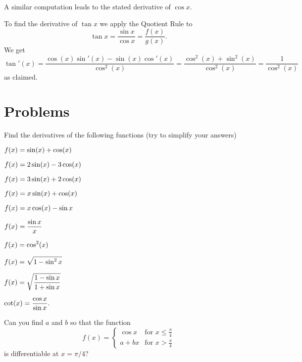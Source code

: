 A similar computation leads to the stated derivative of $\cos x$.




To find the derivative of $\tan x$ we apply the Quotient Rule to
\[
\tan x=\frac{\sin x}{\cos x} = \frac{f(x)}{g(x)}.
\]
We get
\[
\tan'(x)=\frac{\cos(x)\sin'(x) - \sin(x) \cos'(x)}{\cos^2(x)}
=\frac{\cos^2(x)+\sin^2(x)}{\cos^2(x)} =\frac{1}{\cos^2(x)}
\]
as claimed.








\section{Problems} 
\problemfont 
\begin{multicols}{2}\setlength{\parindent}{0pt}
\noindent Find the derivatives of the following functions (try to simplify
your answers)




\problem $\displaystyle f(x) = \sin(x) + \cos(x) $ 




\problem $\displaystyle f(x) = 2\sin(x) - 3\cos(x) $ 




\problem $\displaystyle f(x) = 3\sin(x) + 2\cos(x) $ 




\problem $\displaystyle f(x) = x\sin(x) + \cos(x) $ 




\problem $\displaystyle f(x) = x\cos(x) -\sin x $ 




\problem $\displaystyle f(x) = \frac{\sin x}{x} $ 




\problem $\displaystyle f(x) = \cos^2(x) $ 




\problem $\displaystyle f(x) = \sqrt{1-\sin^2 x} $ 




\problem $\displaystyle f(x) = \sqrt{\frac{1-\sin x}{1+\sin x}} $ 




\problem $\displaystyle \cot(x) = \frac{\cos x}{\sin x}.$ 




\problem Can you find $a$ and $b$ so that the function 
\[
f(x) = \begin{cases}
  \cos x & \text{for $x\leq \frac\pi4$} \\
  a+bx   & \text{for $x > \frac\pi4$}
\end{cases}
\]
is differentiable at $x=\pi/4$?









\end{multicols}
